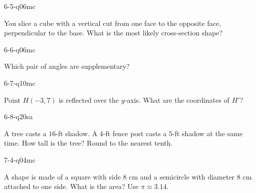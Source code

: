 \begin{practiceQuestion}{6-5-q06}{mc}
\begin{questionText}
You slice a cube with a vertical cut from one face to the opposite face, perpendicular to the base. What is the most likely cross-section shape?
\end{questionText}
\end{practiceQuestion}

\begin{practiceQuestion}{6-6-q06}{mc}
\begin{questionText}
Which pair of angles are supplementary?
\end{questionText}
\end{practiceQuestion}

\begin{practiceQuestion}{6-7-q10}{mc}
\begin{questionText}
Point $H(-3, 7)$ is reflected over the $y$-axis. What are the coordinates of $H'$?
\end{questionText}
\end{practiceQuestion}

\begin{practiceQuestion}{6-8-q20}{sa}
\begin{questionText}
A tree casts a $16$-ft shadow. A $4$-ft fence post casts a $5$-ft shadow at the same time. How tall is the tree? Round to the nearest tenth.
\end{questionText}
\end{practiceQuestion}

\begin{practiceQuestion}{7-4-q04}{mc}
\begin{questionText}
A shape is made of a square with side $8$ cm and a semicircle with diameter $8$ cm attached to one side. What is the area? Use $\pi \approx 3.14$.
\end{questionText}
\end{practiceQuestion}

